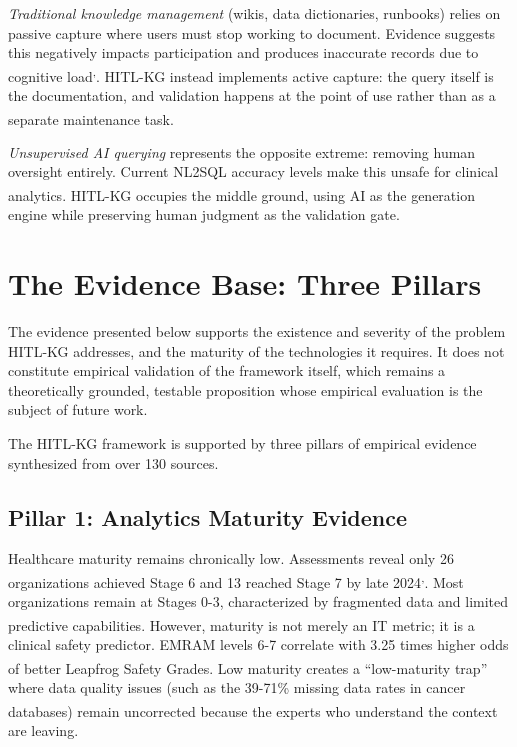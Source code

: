 \documentclass[
  american,
  11pt,
  letterpaper,
  oneside  ,captions=tableheading
]{scrartcl}
\begin{document}
\emph{Traditional knowledge management} (wikis, data dictionaries,
runbooks) relies on passive capture where users must stop working to
document. Evidence suggests this negatively impacts participation and
produces inaccurate records due to cognitive
load\textsuperscript{,}.
HITL-KG instead implements active capture: the query itself is the
documentation, and validation happens at the point of use rather than as
a separate maintenance
task\textsuperscript{}.

\emph{Unsupervised AI querying} represents the opposite extreme:
removing human oversight entirely. Current NL2SQL accuracy levels make
this unsafe for clinical
analytics\textsuperscript{}. HITL-KG
occupies the middle ground, using AI as the generation engine while
preserving human judgment as the validation gate.

\section{The Evidence Base: Three
Pillars}\label{the-evidence-base-three-pillars}

The evidence presented below supports the existence and severity of the
problem HITL-KG addresses, and the maturity of the technologies it
requires. It does not constitute empirical validation of the framework
itself, which remains a theoretically grounded, testable proposition
whose empirical evaluation is the subject of future work.

The HITL-KG framework is supported by three pillars of empirical
evidence synthesized from over 130 sources.

\subsection{Pillar 1: Analytics Maturity
Evidence}\label{pillar-1-analytics-maturity-evidence}

Healthcare maturity remains chronically low. Assessments reveal only 26
organizations achieved Stage 6 and 13 reached Stage 7 by late
2024\textsuperscript{,}.
Most organizations remain at Stages 0-3, characterized by fragmented
data and limited predictive
capabilities\textsuperscript{}. However,
maturity is not merely an IT metric; it is a clinical safety predictor.
EMRAM levels 6-7 correlate with 3.25 times higher odds of better
Leapfrog Safety Grades\textsuperscript{}.
Low maturity creates a ``low-maturity trap'' where data quality issues
(such as the 39-71\% missing data rates in cancer
databases\textsuperscript{}) remain
uncorrected because the experts who understand the context are leaving.
\end{document}
